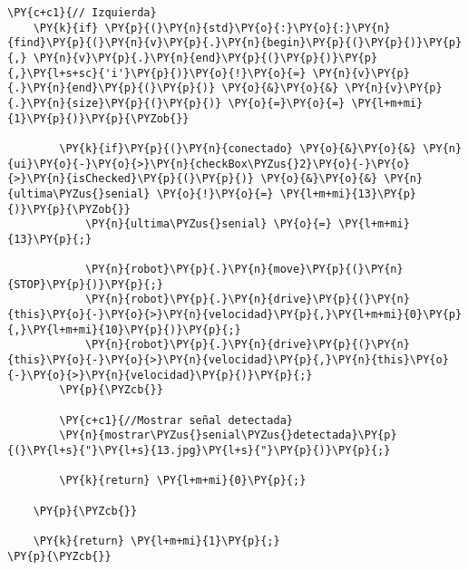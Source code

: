 \begin{Verbatim}[commandchars=\\\{\}]
    \PY{c+c1}{// Izquierda}
    \PY{k}{if} \PY{p}{(}\PY{n}{std}\PY{o}{:}\PY{o}{:}\PY{n}{find}\PY{p}{(}\PY{n}{v}\PY{p}{.}\PY{n}{begin}\PY{p}{(}\PY{p}{)}\PY{p}{,} \PY{n}{v}\PY{p}{.}\PY{n}{end}\PY{p}{(}\PY{p}{)}\PY{p}{,}\PY{l+s+sc}{'i'}\PY{p}{)}\PY{o}{!}\PY{o}{=} \PY{n}{v}\PY{p}{.}\PY{n}{end}\PY{p}{(}\PY{p}{)} \PY{o}{&}\PY{o}{&} \PY{n}{v}\PY{p}{.}\PY{n}{size}\PY{p}{(}\PY{p}{)} \PY{o}{=}\PY{o}{=} \PY{l+m+mi}{1}\PY{p}{)}\PY{p}{\PYZob{}}

        \PY{k}{if}\PY{p}{(}\PY{n}{conectado} \PY{o}{&}\PY{o}{&} \PY{n}{ui}\PY{o}{-}\PY{o}{>}\PY{n}{checkBox\PYZus{}2}\PY{o}{-}\PY{o}{>}\PY{n}{isChecked}\PY{p}{(}\PY{p}{)} \PY{o}{&}\PY{o}{&} \PY{n}{ultima\PYZus{}senial} \PY{o}{!}\PY{o}{=} \PY{l+m+mi}{13}\PY{p}{)}\PY{p}{\PYZob{}}
            \PY{n}{ultima\PYZus{}senial} \PY{o}{=} \PY{l+m+mi}{13}\PY{p}{;}

            \PY{n}{robot}\PY{p}{.}\PY{n}{move}\PY{p}{(}\PY{n}{STOP}\PY{p}{)}\PY{p}{;}
            \PY{n}{robot}\PY{p}{.}\PY{n}{drive}\PY{p}{(}\PY{n}{this}\PY{o}{-}\PY{o}{>}\PY{n}{velocidad}\PY{p}{,}\PY{l+m+mi}{0}\PY{p}{,}\PY{l+m+mi}{10}\PY{p}{)}\PY{p}{;}
            \PY{n}{robot}\PY{p}{.}\PY{n}{drive}\PY{p}{(}\PY{n}{this}\PY{o}{-}\PY{o}{>}\PY{n}{velocidad}\PY{p}{,}\PY{n}{this}\PY{o}{-}\PY{o}{>}\PY{n}{velocidad}\PY{p}{)}\PY{p}{;}
        \PY{p}{\PYZcb{}}

        \PY{c+c1}{//Mostrar señal detectada}
        \PY{n}{mostrar\PYZus{}senial\PYZus{}detectada}\PY{p}{(}\PY{l+s}{"}\PY{l+s}{13.jpg}\PY{l+s}{"}\PY{p}{)}\PY{p}{;}

        \PY{k}{return} \PY{l+m+mi}{0}\PY{p}{;}

    \PY{p}{\PYZcb{}}

    \PY{k}{return} \PY{l+m+mi}{1}\PY{p}{;}
\PY{p}{\PYZcb{}}
\end{Verbatim}
